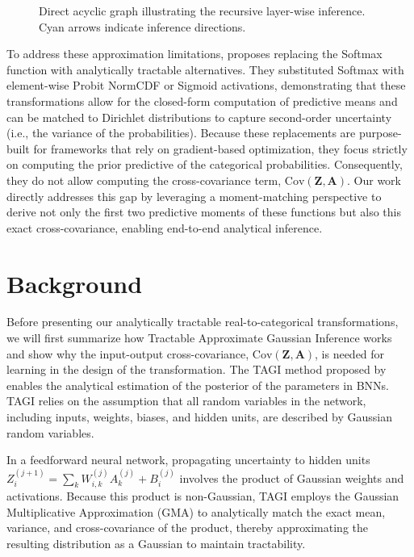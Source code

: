 \documentclass{uai2026} %
\begin{document}
\begin{figure}[t]
    \centering
    \vspace{-2em} %
    \caption{Direct acyclic graph illustrating the recursive layer-wise inference. Cyan arrows indicate inference directions.}
    \label{fig:update-tagi}
\end{figure}

To address these approximation limitations, \cite{Mucsanyietal2025} proposes replacing the Softmax function with analytically tractable alternatives. They substituted Softmax with element-wise Probit NormCDF or Sigmoid activations, demonstrating that these transformations allow for the closed-form computation of predictive means and can be matched to Dirichlet distributions to capture second-order uncertainty (i.e., the variance of the probabilities). Because these replacements are purpose-built for frameworks that rely on gradient-based optimization, they focus strictly on computing the prior predictive of the categorical probabilities. Consequently, they do not allow computing the cross-covariance term, $\text{Cov}(\bm{Z}, \bm{A})$. Our work directly addresses this gap by leveraging a moment-matching perspective to derive not only the first two predictive moments of these functions but also this exact cross-covariance, enabling end-to-end analytical inference.


\section{Background}
Before presenting our analytically tractable real-to-categorical transformations, we will first summarize how Tractable Approximate Gaussian Inference works and show why the input-output cross-covariance, $\text{Cov}(\bm{Z}, \bm{A})$, is needed for learning in the design of the transformation. The TAGI method proposed by \cite{goulet2021tractable, nguyen2022analytically} enables the analytical estimation of the posterior of the parameters in BNNs. TAGI relies on the assumption that all random variables in the network, including inputs, weights, biases, and hidden units, are described by Gaussian random variables.

In a feedforward neural network, propagating uncertainty to hidden units $Z_{i}^{(j+1)} = \sum_k W_{i,k}^{(j)} A_k^{(j)} + B_i^{(j)}$ involves the product of Gaussian weights and activations. Because this product is non-Gaussian, TAGI employs the Gaussian Multiplicative Approximation (GMA) to analytically match the exact mean, variance, and cross-covariance of the product, thereby approximating the resulting distribution as a Gaussian to maintain tractability.
\end{document}
